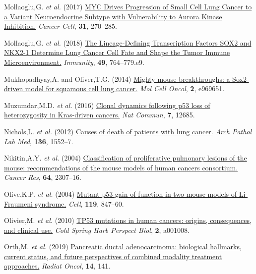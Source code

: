 \begin{CSLReferences}{1}{0}
\leavevmode{}%
Mollaoglu,G. \emph{et al.} (2017) \href{https://doi.org/10.1016/j.ccell.2016.12.005}{MYC Drives Progression of Small Cell Lung Cancer to a Variant Neuroendocrine Subtype with Vulnerability to Aurora Kinase Inhibition.} \emph{Cancer Cell}, \textbf{31}, 270--285.

\leavevmode{}%
Mollaoglu,G. \emph{et al.} (2018) \href{https://doi.org/10.1016/j.immuni.2018.09.020}{The Lineage-Defining Transcription Factors SOX2 and NKX2-1 Determine Lung Cancer Cell Fate and Shape the Tumor Immune Microenvironment.} \emph{Immunity}, \textbf{49}, 764--779.e9.

\leavevmode{}%
Mukhopadhyay,A. and Oliver,T.G. (2014) \href{https://doi.org/10.4161/23723548.2014.969651}{Mighty mouse breakthroughs: a Sox2-driven model for squamous cell lung cancer.} \emph{Mol Cell Oncol}, \textbf{2}, e969651.

\leavevmode{}%
Muzumdar,M.D. \emph{et al.} (2016) \href{https://doi.org/10.1038/ncomms12685}{Clonal dynamics following p53 loss of heterozygosity in Kras-driven cancers.} \emph{Nat Commun}, \textbf{7}, 12685.

\leavevmode{}%
Nichols,L. \emph{et al.} (2012) \href{https://doi.org/10.5858/arpa.2011-0521-oa}{Causes of death of patients with lung cancer.} \emph{Arch Pathol Lab Med}, \textbf{136}, 1552--7.

\leavevmode{}%
Nikitin,A.Y. \emph{et al.} (2004) \href{https://doi.org/10.1158/0008-5472.can-03-3376}{Classification of proliferative pulmonary lesions of the mouse: recommendations of the mouse models of human cancers consortium.} \emph{Cancer Res}, \textbf{64}, 2307--16.

\leavevmode{}%
Olive,K.P. \emph{et al.} (2004) \href{https://doi.org/10.1016/j.cell.2004.11.004}{Mutant p53 gain of function in two mouse models of Li-Fraumeni syndrome.} \emph{Cell}, \textbf{119}, 847--60.

\leavevmode{}%
Olivier,M. \emph{et al.} (2010) \href{https://doi.org/10.1101/cshperspect.a001008}{TP53 mutations in human cancers: origins, consequences, and clinical use.} \emph{Cold Spring Harb Perspect Biol}, \textbf{2}, a001008.

\leavevmode{}%
Orth,M. \emph{et al.} (2019) \href{https://doi.org/10.1186/s13014-019-1345-6}{Pancreatic ductal adenocarcinoma: biological hallmarks, current status, and future perspectives of combined modality treatment approaches.} \emph{Radiat Oncol}, \textbf{14}, 141.


\end{CSLReferences}
